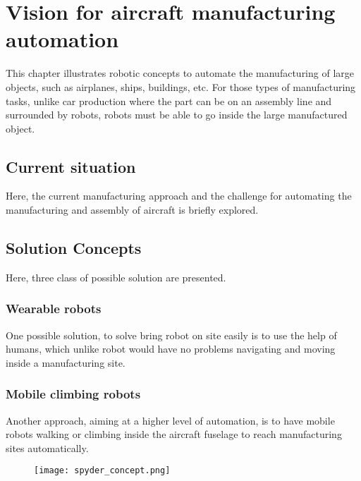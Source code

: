 \chapter{Vision for aircraft manufacturing automation}
\label{sec:VisionForAircraftManufacturingAutomation}

This chapter illustrates robotic concepts to automate the manufacturing of large objects, such as airplanes, ships, buildings, etc. For those types of manufacturing tasks, unlike car production where the part can be on an assembly line and surrounded by robots, robots must be able to go inside the large manufactured object. %


\section{Current situation}
\label{sec:CurrentSituation}

Here, the current manufacturing approach and the challenge for automating the manufacturing and assembly of aircraft is briefly explored.


\section{Solution Concepts}

Here, three class of possible solution are presented.

\subsection{Wearable robots}
\label{sec:WearableRobots}

One possible solution, to solve bring robot on site easily is to use the help of humans, which unlike robot would have no problems navigating and moving inside a manufacturing site.


\subsection{Mobile climbing robots}
\label{sec:MobileClimbingRobots}

Another approach, aiming at a higher level of automation, is to have mobile robots walking or climbing inside the aircraft fuselage to reach manufacturing sites automatically. 


\begin{figure}[H]
	\centering
		\texttt{[image: spyder\_concept.png]}
	\label{fig:arm_concept}
\end{figure}


